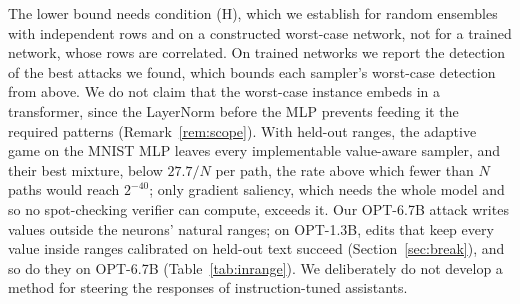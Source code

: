  The lower bound needs condition (H), which we establish for
random ensembles with independent rows and on a constructed worst-case network, not for a trained
network, whose rows are correlated. On trained networks we report the detection of the best attacks
we found, which bounds each sampler's worst-case detection from above. We do not claim that the
worst-case instance embeds in a transformer, since the LayerNorm before the MLP prevents feeding it
the required patterns (Remark~\ref{rem:scope}). With held-out ranges, the adaptive game on the MNIST
MLP leaves every implementable value-aware sampler, and their best mixture, below $27.7/N$ per path,
the rate above which fewer than $N$ paths would reach $2^{-40}$;
only gradient saliency, which needs the whole model and so no spot-checking verifier can compute,
exceeds it. Our OPT-6.7B attack writes values outside the neurons' natural ranges; on OPT-1.3B, edits
that keep every value inside ranges calibrated on held-out text succeed (Section~\ref{sec:break}),
and so do they on OPT-6.7B (Table~\ref{tab:inrange}). We deliberately do not develop a method for
steering the responses of instruction-tuned assistants.
